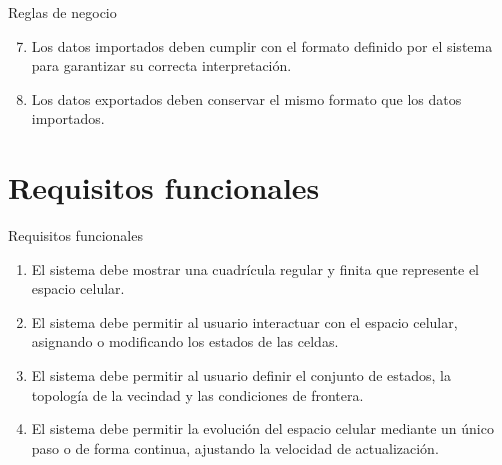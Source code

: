 \begin{frame}{Reglas de negocio}
	\begin{enumerate}[label=RN\arabic*.]
		\setcounter{enumi}{6}
		
		\item Los datos importados deben cumplir con el formato definido por el sistema para garantizar su correcta interpretación.
		
		\item Los datos exportados deben conservar el mismo formato que los datos importados.
	\end{enumerate}
\end{frame}



\section{Requisitos funcionales}


\begin{frame}{Requisitos funcionales}
	\begin{enumerate}[label=RF\arabic*.]
		\item El sistema debe mostrar una cuadrícula regular y finita que represente el espacio celular.
		
		\item El sistema debe permitir al usuario interactuar con el espacio celular, asignando o modificando los estados de las celdas.
		
		\item El sistema debe permitir al usuario definir el conjunto de estados, la topología de la vecindad y las condiciones de frontera.
		
		\item El sistema debe permitir la evolución del espacio celular mediante un único paso o de forma continua, ajustando la velocidad de actualización.
	\end{enumerate}
\end{frame}


